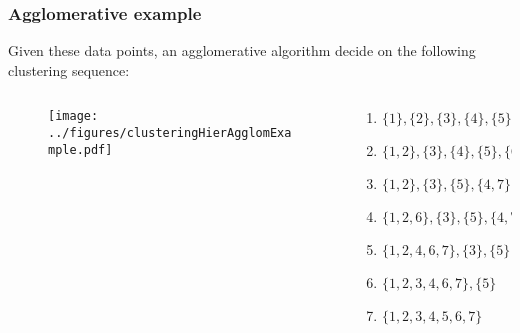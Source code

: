 \documentclass{beamer}
\begin{document}
\begin{frame}
\frametitle{Agglomerative example}
Given these data points, an agglomerative algorithm  decide on the following clustering sequence:

\begin{columns}[T]
\begin{column}{.48\textwidth}
\begin{figure}[h!]
  \centering
  \texttt{[image: ../figures/clusteringHierAgglomExample.pdf]}
\end{figure}
\end{column}
\begin{column}{.55\textwidth}
\vsp
\begin{enumerate}
\item $\{1\}, \{2\}, \{3\}, \{4\}, \{5\}, \{6\}, \{7\}$
\item $\{1,2\}, \{3\}, \{4\}, \{5\}, \{6\}, \{7\}$
\item $\{1,2\}, \{3\}, \{5\}, \{4,7\}$
\item $\{1,2,6\}, \{3\}, \{5\}, \{4,7\}$
\item $\{1,2,4,6,7\}, \{3\}, \{5\}$
\item $\{1,2,3,4,6,7\},  \{5\}$
\item $\{1,2,3,4,5,6,7\}$
\end{enumerate}
\end{column}
\end{columns}
\end{frame}
%
%
%
%
%
\end{document}
